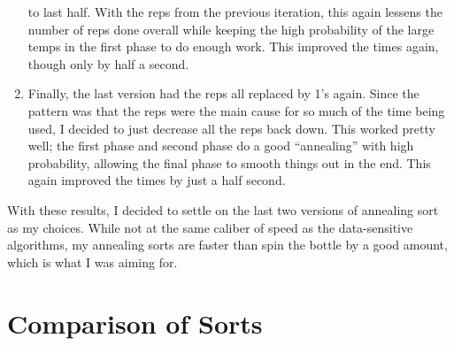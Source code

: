 \documentclass{article}
\begin{document}
\begin{enumerate}
            to last half. With the reps from the previous iteration, this 
            again lessens the number of reps done overall while keeping the
            high probability of the large temps in the first phase to do enough
            work. This improved the times again, though only by half a second.
        \item Finally, the last version had the reps all replaced by 1's again.
            Since the pattern was that the reps were the main cause for so much
            of the time being used, I decided to just decrease all the reps
            back down. This worked pretty well; the first phase and second phase
            do a good ``annealing'' with high probability, allowing the final
            phase to smooth things out in the end. This again improved the times
            by just a half second. 
    \end{enumerate}
    With these results, I decided to settle on the last two versions of
    annealing sort as my choices. While not at the same caliber of speed as the
    data-sensitive algorithms, my annealing sorts are faster than spin the
    bottle by a good amount, which is what I was aiming for.

\section{Comparison of Sorts}
\end{document}
